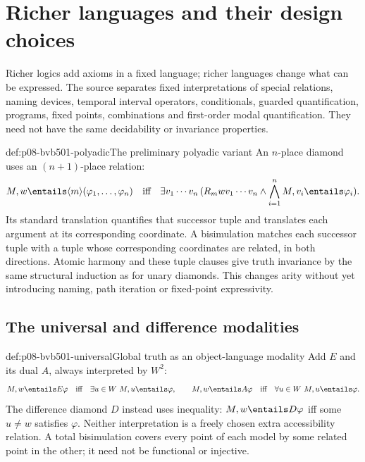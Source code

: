\section{Richer languages and their design choices}
\label{sec:p08-bvb501-richer-languages}

Richer logics add axioms in a fixed language; richer languages change
what can be expressed. The source separates fixed interpretations of
special relations, naming devices, temporal interval operators,
conditionals, guarded quantification, programs, fixed points, combinations
and first-order modal quantification. They need not have the same
decidability or invariance properties.

\begin{hbdefinition}{def:p08-bvb501-polyadic}{The preliminary polyadic variant}
An \(n\)-place diamond uses an \((n+1)\)-place relation:
\[
 M,w\entails\langle m\rangle(\varphi_1,\ldots,\varphi_n)
 \quad\text{iff}\quad
 \exists v_1\cdots v_n\,(R_mwv_1\cdots v_n\land
             \bigwedge_{i=1}^n M,v_i\entails\varphi_i).
\]
Its standard translation quantifies that successor tuple and translates
each argument at its corresponding coordinate. A bisimulation matches
each successor tuple with a tuple whose corresponding coordinates are
related, in both directions. Atomic harmony and these tuple clauses give
truth invariance by the same structural induction as for unary diamonds.
This changes arity without yet introducing naming, path iteration or
fixed-point expressivity.
\end{hbdefinition}

\subsection{The universal and difference modalities}
\label{sec:p08-bvb501-universal}

\begin{hbdefinition}{def:p08-bvb501-universal}{Global truth as an object-language modality}
Add \(E\) and its dual \(A\), always interpreted by \(W^2\):
\[
 M,w\entails E\varphi\quad\text{iff}\quad
 \exists u\in W\ M,u\entails\varphi,\qquad
 M,w\entails A\varphi\quad\text{iff}\quad
 \forall u\in W\ M,u\entails\varphi.
\]
The difference diamond \(D\) instead uses inequality:
\(M,w\entails D\varphi\) iff some \(u\ne w\) satisfies
\(\varphi\). Neither interpretation is a freely chosen extra
accessibility relation. A total bisimulation covers every point of
each model by some related point in the other; it need not be functional
or injective.
\end{hbdefinition}

